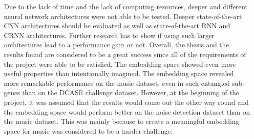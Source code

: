 \newline
Due to the lack of time and the lack of computing resources, deeper and different neural network architectures were not able to be tested. Deeper state-of-the-art \gls{CNN} architectures should be evaluated as well as state-of-the-art \gls{RNN} and \gls{CRNN} architectures. Further research has to show if using such larger architectures lead to a performance gain or not.
\newline
\newline
Overall, the thesis and the results found are considered to be a great success since all of the requirements of the project were able to be satisfied. The embedding space showed even more useful properties than intentionally imagined. The embedding space revealed more remarkable performance on the music dataset, even in such entangled sub-genes than on the \gls{DCASE} challenge dataset. However, at the beginning of the project, it was assumed that the results would come out the other way round and the embedding space would perform better on the noise detection dataset than on the music dataset. This was mainly because to create a meaningful embedding space for music was considered to be a harder challenge.

